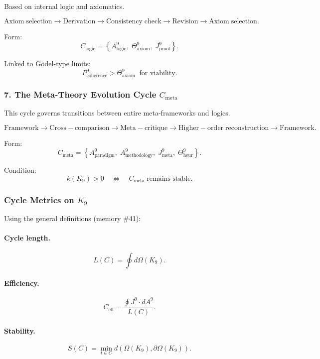 Based on internal logic and axiomatics.

\[
  \mathrm{Axiom\;selection}
  \to
  \mathrm{Derivation}
  \to
  \mathrm{Consistency\;check}
  \to
  \mathrm{Revision}
  \to
  \mathrm{Axiom\;selection}.
\]

Form:
\[
 C_{\mathrm{logic}}
  =
  \left\{
    A^9_{\mathrm{logic}},\;
    \Theta^9_{\mathrm{axiom}},\;
    J^9_{\mathrm{proof}}
  \right\}.
\]

Linked to Gödel-type limits:
\[
  P^9_{\mathrm{coherence}} > \Theta^9_{\mathrm{axiom}}
  \;\;\text{for viability}.
\]


\subsubsection{7. The Meta-Theory Evolution Cycle $C_{\mathrm{meta}}$}

This cycle governs transitions between entire meta-frameworks and logics.

\[
  \mathrm{Framework}
  \to
  \mathrm{Cross\!-\!comparison}
  \to
  \mathrm{Meta\!-\!critique}
  \to
  \mathrm{Higher\!-\!order\;reconstruction}
  \to
  \mathrm{Framework}.
\]

Form:
\[
 C_{\mathrm{meta}}
 =
 \left\{
   A^9_{\mathrm{paradigm}},\;
   A^9_{\mathrm{methodology}},\;
   J^9_{\mathrm{meta}},\;
   \Theta^9_{\mathrm{heur}}
 \right\}.
\]

Condition:
\[
  k(K_9) > 0 \quad\Leftrightarrow\quad
  C_{\mathrm{meta}}\;\text{remains stable}.
\]


\subsubsection{Cycle Metrics on \texorpdfstring{$K_9$}{K_9}}

Using the general definitions (memory \#41):

\paragraph{Cycle length.}
\[
  L(C) = \oint d\Omega(K_9).
\]

\paragraph{Efficiency.}
\[
  C_{\mathrm{eff}} = 
  \frac{\oint J^9 \cdot dA^9}{L(C)}.
\]

\paragraph{Stability.}
\[
  S(C)
    = \min_{t\in C}
      d(\Omega(K_9),\partial\Omega(K_9)).
\]

